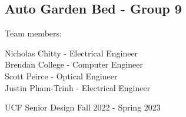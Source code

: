 \begin{titlepage}
    \begin{center}
        \section*{Auto Garden Bed - Group 9}
        \begin{Large}
            Team members:\\
            \vspace{.5cm}
        \end{Large}
        \begin{large}
            Nicholas Chitty - Electrical Engineer\\
            Brendan College - Computer Engineer\\
            Scott Peirce - Optical Engineer\\
            Justin Pham-Trinh - Electrical Engineer \\
        \end{large}
        \vfill
        UCF Senior Design Fall 2022 - Spring 2023

        \pagebreak
    \end{center}
\end{titlepage}